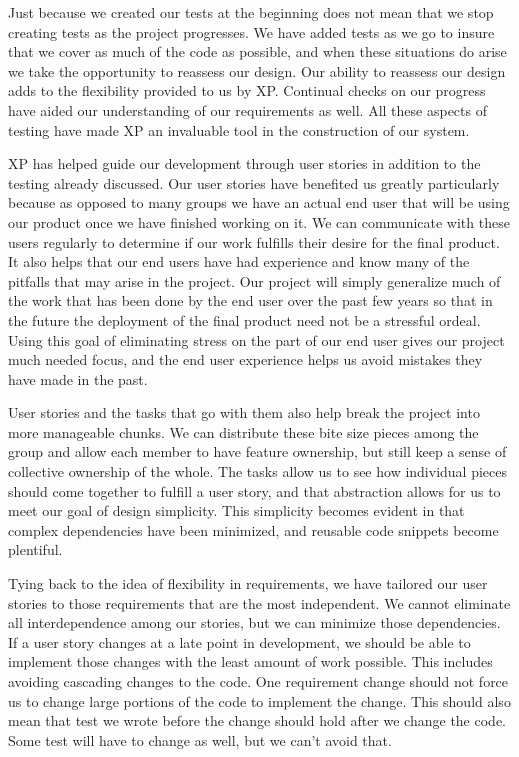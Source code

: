 \documentclass[12pt]{article}
\begin{document}
Just because we created our tests at the beginning does not mean that we stop creating tests as the project progresses. We have added tests as we go to insure that we cover as much of the code as possible, and when these situations do arise we take the opportunity to reassess our design. Our ability to reassess our design adds to the flexibility provided to us by XP. Continual checks on our progress have aided our understanding of our requirements as well. All these aspects of testing have made XP an invaluable tool in the construction of our system.

XP has helped guide our development through user stories in addition to the testing already discussed. Our user stories have benefited us greatly particularly because as opposed to many groups we have an actual end user that will be using our product once we have finished working on it. We can communicate with these users regularly to determine if our work fulfills their desire for the final product. It also helps that our end users have had experience and know many of the pitfalls that may arise in the project. Our project will simply generalize much of the work that has been done by the end user over the past few years so that in the future the deployment of the final product need not be a stressful ordeal. Using this goal of eliminating stress on the part of our end user gives our project much needed focus, and the end user experience helps us avoid mistakes they have made in the past.

User stories and the tasks that go with them also help break the project into more manageable chunks. We can distribute these bite size pieces among the group and allow each member to have feature ownership, but still keep a sense of collective ownership of the whole. The tasks allow us to see how individual pieces should come together to fulfill a user story, and that abstraction allows for us to meet our goal of design simplicity. This simplicity becomes evident in that complex dependencies have been minimized, and reusable code snippets become plentiful.

Tying back to the idea of flexibility in requirements, we have tailored our user stories to those requirements that are the most independent. We cannot eliminate all interdependence among our stories, but we can minimize those dependencies. If a user story changes at a late point in development, we should be able to implement those changes with the least amount of work possible. This includes avoiding cascading changes to the code. One requirement change should not force us to change large portions of the code to implement the change. This should also mean that test we wrote before the change should hold after we change the code. Some test will have to change as well, but we can't avoid that. 
\end{document}
